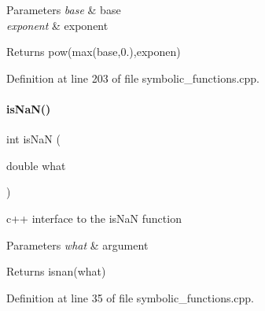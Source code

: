 \begin{DoxyParams}{Parameters}
{\em base} & base \\
\hline
{\em exponent} & exponent \\
\hline
\end{DoxyParams}
\begin{DoxyReturn}{Returns}
pow(max(base,0.),exponen) 
\end{DoxyReturn}


Definition at line 203 of file symbolic\+\_\+functions.\+cpp.

\mbox{\label{namespaceamici_a7452657cd5f8d541f9e823df5e82c516}} 
\paragraph{\texorpdfstring{isNaN()}{isNaN()}}
{\footnotesize\ttfamily int is\+NaN (\begin{DoxyParamCaption}\item[{double}]{what }\end{DoxyParamCaption})}

c++ interface to the is\+NaN function


\begin{DoxyParams}{Parameters}
{\em what} & argument \\
\hline
\end{DoxyParams}
\begin{DoxyReturn}{Returns}
isnan(what) 
\end{DoxyReturn}


Definition at line 35 of file symbolic\+\_\+functions.\+cpp.

